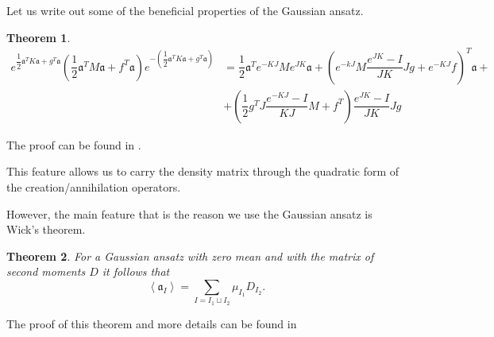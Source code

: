 \documentclass[12pt]{article}
\newtheorem{theorem}{Theorem}
\theoremstyle{definition}
\newcommand\Tr{\operatorname{Tr}}
\newcommand\bra{\left<}
\newcommand\ket{\right>}
\newcommand{\braket}[1]{\bra#1\ket}
\newcommand{\mf}[1]{\mathfrak{#1}}
\begin{document}
	
	
%	
	
	Let us write out some of the beneficial properties of the Gaussian ansatz.
	
	\begin{theorem}
		\label{th:KvFor}
		\begin{align*}
			\label{eq:KvFor}
			e^{\dfrac{1}{2}\mf{a}^TK\mf{a} + g^T\mf{a}}(\dfrac{1}{2}\mf{a}^TM\mf{a} + f^T\mf{a})e^{-(\dfrac{1}{2}\mf{a}^TK\mf{a} + g^T\mf{a})} &= \dfrac{1}{2}\mf{a}^Te^{-KJ}Me^{JK}\mf{a} + \left(e^{-kJ}M\dfrac{e^{JK}-I}{JK}Jg + e^{-KJ}f\right)^T\mf{a} + \nonumber\\
			&+ \left(\dfrac{1}{2}g^TJ\dfrac{e^{-KJ}-I}{KJ}M + f^T\right)\dfrac{e^{JK} - I}{JK}Jg&
		\end{align*}
	\end{theorem}
	The proof can be found in \cite{Dis}. 
	
	This feature allows us to carry the density matrix through the quadratic form of the creation/annihilation operators.
	
	However, the main feature that is the reason we use the Gaussian ansatz is Wick's theorem.
	
	\begin{theorem}
		\label{th:IW0}
		For a Gaussian ansatz with zero mean and with the matrix of second moments $D$ it follows that 
		\begin{equation*}
			\braket{\mf{a}_I} = \sum\limits_{I = I_1 \sqcup I_2}\mu_{I_1}D_{I_2}.
		\end{equation*}
	\end{theorem}
	The proof of this theorem and more details can be found in \cite{NosalTeretenkov}
	
\end{document}
